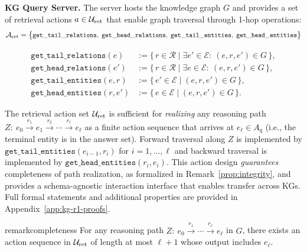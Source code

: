 \noindent\textbf{KG Query Server.}
\label{subsub:kg-server}
The server hosts the knowledge graph \(G\) and provides a set of retrieval actions \(a \in \mathcal{U}_{\text{ret}}\) that enable graph traversal through 1-hop operations:
\[
\mathcal{A}_{\mathrm{ret}}
= \bigl\{ \scalebox{0.9}{$\gettailrelations,\ \getheadrelations,\ 
\gettailentities,\ \getheadentities$} \bigr\}
\]

\vspace{-2.5em}
\begin{align*}
\mathtt{get\_tail\_relations} (e)
&:= \{\, r \in \mathcal{R} \mid \exists e'\in\mathcal{E}:\ (e,r,e')\in G \,\},\\
\mathtt{get\_head\_relations} (e')
&:= \{\, r \in \mathcal{R} \mid \exists e\in\mathcal{E}:\ (e,r,e')\in G \,\},\\
\mathtt{get\_tail\_entities} (e,r)
&:= \{\, e' \in \mathcal{E} \mid (e,r,e')\in G \,\},\\
\mathtt{get\_head\_entities} (r,e')
&:= \{\, e \in \mathcal{E} \mid (e,r,e')\in G \,\}.
\end{align*}
\vspace{-1.5em}

The retrieval action set \(\mathcal{U}_{\text{ret}}\) is sufficient for \emph{realizing} any reasoning path \(Z:\ e_0 \xrightarrow{r_1} e_1 \xrightarrow{r_2} \cdots \xrightarrow{r_\ell} e_\ell\) as a finite action sequence that arrives at \(e_\ell \in A_q\) (i.e., the terminal entity is in the answer set). Forward traversal along \(Z\) is implemented by \(\mathtt{get\_tail\_entities} (e_{i-1},r_i)\) for \(i=1,\dots,\ell\) and backward traversal is implemented by \(\mathtt{get\_head\_entities} (r_i,e_i)\). 
This action design \emph{guarantees} completeness of path realization, as formalized in Remark~\ref{prop:integrity}, and provides a schema-agnostic interaction interface that enables transfer across KGs. Full formal statements and additional properties are provided in Appendix~\ref{app:kg-r1-proofs}.

\begin{restatable}{remark}{completeness}
\label{prop:integrity}
For any reasoning path \(Z:\ e_0 \xrightarrow{r_1}\cdots\xrightarrow{r_\ell} e_\ell\) in \(G\), there exists an action sequence in \(\mathcal{U}_{\text{ret}}\) of length at most \(\ell{+}1\) whose output includes \(e_\ell\).
\end{restatable}




